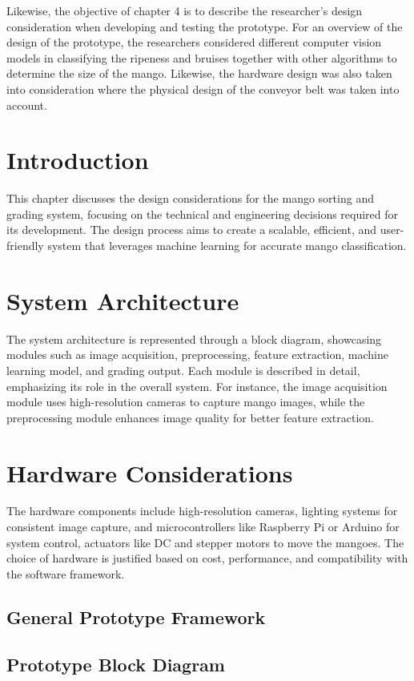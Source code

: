 
Likewise, the objective of chapter 4 is to describe the researcher's design 
consideration when developing and testing the prototype. For an overview of 
the design of the prototype, the researchers considered different computer vision models in
 classifying the ripeness and bruises together with other algorithms to determine 
 the size of the mango. Likewise, the hardware design was also taken into consideration where 
 the physical design of the conveyor belt was taken into account.

\section{Introduction}
This chapter discusses the design considerations for the mango 
sorting and grading system, focusing on the technical and engineering decisions 
required for its development. The design process aims to create a scalable, efficient, 
and user-friendly system that leverages machine learning for accurate mango classification.

\section{System Architecture}
The system architecture is represented through a block diagram, showcasing modules such as image acquisition, 
preprocessing, feature extraction, machine learning model, and grading output. Each module is described in detail, 
emphasizing its role in the overall system. For instance, the image acquisition module uses high-resolution cameras 
to capture mango images, while the preprocessing module enhances image quality for better feature extraction.

\section{Hardware Considerations}
The hardware components include high-resolution cameras, lighting systems for consistent image capture, and 
microcontrollers like Raspberry Pi or Arduino for system control, actuators like DC and stepper motors to move 
the mangoes. The choice of hardware is justified based on cost, performance, and compatibility with the software framework.

\subsection{General Prototype Framework}

\subsection{Prototype Block Diagram}

